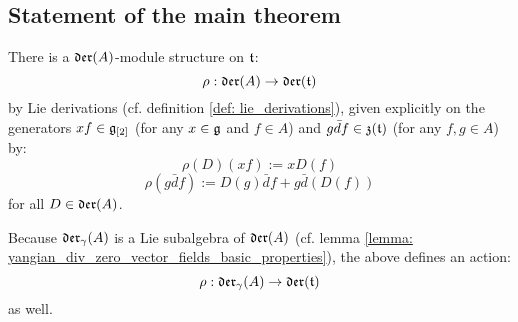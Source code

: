     \subsection{Statement of the main theorem}
        \begin{lemma} \label{lemma: a_fixed_yangian_div_zero_vector_field_action} 
            There is a $\mathfrak{der}(A)$-module structure on $\mathfrak{t}$:
                $$\rho: \mathfrak{der}(A) \to \mathfrak{der}(\mathfrak{t})$$
            by Lie derivations (cf. definition \ref{def: lie_derivations}), given explicitly on the generators $xf \in \mathfrak{g}_{[2]}$ (for any $x \in \mathfrak{g}$ and $f \in A$) and $g \bar{d}f \in \mathfrak{z}(\mathfrak{t})$ (for any $f, g \in A$) by:
                $$\rho(D)( xf ) := x D(f)$$
                $$\rho( g\bar{d}f ) := D(g) \bar{d}f + g \bar{d}(D(f))$$
            for all $D \in \mathfrak{der}(A)$.
            
            Because $\mathfrak{der}_{\gamma}(A)$ is a Lie subalgebra of $\mathfrak{der}(A)$ (cf. lemma \ref{lemma: yangian_div_zero_vector_fields_basic_properties}), the above defines an action:
                $$\rho: \mathfrak{der}_{\gamma}(A) \to \mathfrak{der}(\mathfrak{t})$$
            as well.
        \end{lemma}
